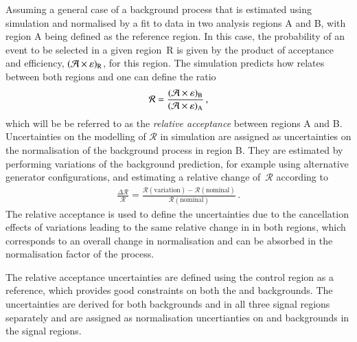 Assuming a general case of a background process that is estimated
using simulation and normalised by a fit to data in two analysis
regions A and B, with region A being defined as the reference
region. In this case, the probability of an event to be selected in a
given region~R is given by the product of acceptance and efficiency,
$(\mathcal{A} \times \varepsilon)_{\text{R}}$, for this region. The simulation predicts
how \AccTimesEff relates between both regions and one can define the
ratio
\begin{align*}
  \mathcal{R} = \frac{(\mathcal{A} \times \varepsilon)_{\text{B}}}{(\mathcal{A} \times \varepsilon)_{\text{A}}} \,\text{,}
\end{align*}
which will be be referred to as the \emph{relative acceptance} between
regions A and B. Uncertainties on the modelling of $\mathcal{R}$ in
simulation are assigned as uncertainties on the normalisation of the
background process in region B. They are
estimated by performing variations of the background prediction, for
example using alternative generator configurations, and estimating a
relative change of~$\mathcal{R}$ according to
\begin{align}
  \frac{\Delta \mathcal{R}}{\mathcal{R}} = \frac{\mathcal{R}(\text{variation}) - \mathcal{R}(\text{nominal})}{\mathcal{R}(\text{nominal})} \,\text{.}
  \label{eq:relative_acceptance_uncertainty}
\end{align}
The relative acceptance is used to define the uncertainties due to the
cancellation effects of variations leading to the same relative change
in \AccTimesEff in both regions, which corresponds to an overall
change in normalisation and can be absorbed in the normalisation
factor of the process.

The relative acceptance uncertainties are defined using the \ZHF
control region as a reference, which provides good constraints on both
the \ZHF and \ttbar backgrounds. The uncertainties are derived for
both backgrounds and in all three signal regions separately and are
assigned as normalisation uncertianties on \ZHF and \ttbar backgrounds
in the signal regions.



